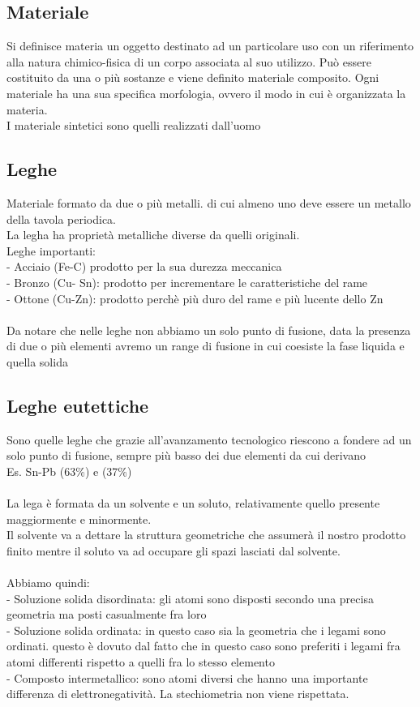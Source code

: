 \subsection{Materiale}
Si definisce materia un oggetto destinato ad un particolare uso con un riferimento alla natura chimico-fisica di un corpo associata al suo utilizzo. Può essere costituito da una o più sostanze e viene definito materiale composito.  Ogni materiale ha una sua specifica morfologia, ovvero il modo in cui è organizzata la materia.\\
I materiale sintetici sono quelli realizzati dall’uomo
\subsection{Leghe}
Materiale formato da due o più metalli. di cui almeno uno deve essere un metallo della tavola periodica. \\
La legha ha proprietà metalliche diverse da quelli originali. \\
Leghe importanti:\\
\tab- Acciaio (Fe-C) prodotto per la sua durezza meccanica\\
\tab- Bronzo (Cu- Sn): prodotto per incrementare le caratteristiche del rame\\
\tab- Ottone (Cu-Zn): prodotto perchè più duro del rame e più lucente dello Zn\\\\
Da notare che nelle leghe non abbiamo un solo punto di fusione, data la presenza di due o più elementi avremo un range di fusione in cui coesiste la fase liquida e quella solida
\subsection{Leghe eutettiche}
Sono quelle leghe che grazie all’avanzamento tecnologico riescono a fondere ad un solo punto di fusione, sempre più basso dei due elementi da cui derivano\\
Es. Sn-Pb (63\%) e (37\%)\\\\
La lega è formata da un solvente e un soluto, relativamente quello presente maggiormente e minormente.\\
Il solvente va a dettare la struttura geometriche che assumerà il nostro prodotto finito mentre il soluto va ad occupare gli spazi lasciati dal solvente. \\\\
Abbiamo quindi:\\
\tab- Soluzione solida disordinata: gli atomi sono disposti secondo una precisa geometria ma posti casualmente fra loro\\
\tab- Soluzione solida ordinata: in questo caso sia la geometria che i legami sono ordinati. questo è dovuto dal fatto che in questo caso sono preferiti i legami fra atomi differenti rispetto a quelli fra lo stesso elemento\\
\tab- Composto intermetallico: sono atomi diversi che hanno una importante differenza di elettronegatività. La stechiometria non viene rispettata. 
